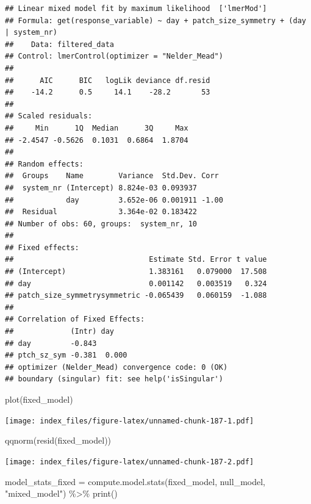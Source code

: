 \documentclass[
]{article}
\newenvironment{Shaded}{\begin{snugshade}}{\end{snugshade}}
\newcommand{\FunctionTok}[1]{\textcolor[rgb]{0.00,0.00,0.00}{#1}}
\newcommand{\NormalTok}[1]{#1}
\newcommand{\OtherTok}[1]{\textcolor[rgb]{0.56,0.35,0.01}{#1}}
\newcommand{\SpecialCharTok}[1]{\textcolor[rgb]{0.00,0.00,0.00}{#1}}
\newcommand{\StringTok}[1]{\textcolor[rgb]{0.31,0.60,0.02}{#1}}
\begin{document}
\begin{verbatim}
## Linear mixed model fit by maximum likelihood  ['lmerMod']
## Formula: get(response_variable) ~ day + patch_size_symmetry + (day | system_nr)
##    Data: filtered_data
## Control: lmerControl(optimizer = "Nelder_Mead")
## 
##      AIC      BIC   logLik deviance df.resid 
##    -14.2      0.5     14.1    -28.2       53 
## 
## Scaled residuals: 
##     Min      1Q  Median      3Q     Max 
## -2.4547 -0.5626  0.1031  0.6864  1.8704 
## 
## Random effects:
##  Groups    Name        Variance  Std.Dev. Corr 
##  system_nr (Intercept) 8.824e-03 0.093937      
##            day         3.652e-06 0.001911 -1.00
##  Residual              3.364e-02 0.183422      
## Number of obs: 60, groups:  system_nr, 10
## 
## Fixed effects:
##                               Estimate Std. Error t value
## (Intercept)                   1.383161   0.079000  17.508
## day                           0.001142   0.003519   0.324
## patch_size_symmetrysymmetric -0.065439   0.060159  -1.088
## 
## Correlation of Fixed Effects:
##             (Intr) day   
## day         -0.843       
## ptch_sz_sym -0.381  0.000
## optimizer (Nelder_Mead) convergence code: 0 (OK)
## boundary (singular) fit: see help('isSingular')
\end{verbatim}

\begin{Shaded}
\begin{Highlighting}[]
\FunctionTok{plot}\NormalTok{(fixed\_model)}
\end{Highlighting}
\end{Shaded}

\texttt{[image: index\_files/figure-latex/unnamed-chunk-187-1.pdf]}

\begin{Shaded}
\begin{Highlighting}[]
\FunctionTok{qqnorm}\NormalTok{(}\FunctionTok{resid}\NormalTok{(fixed\_model))}
\end{Highlighting}
\end{Shaded}

\texttt{[image: index\_files/figure-latex/unnamed-chunk-187-2.pdf]}

\begin{Shaded}
\begin{Highlighting}[]
\NormalTok{model\_stats\_fixed }\OtherTok{=} \FunctionTok{compute.model.stats}\NormalTok{(fixed\_model,}
\NormalTok{                                              null\_model,}
                                              \StringTok{"mixed\_model"}\NormalTok{) }\SpecialCharTok{\%\textgreater{}\%}
  \FunctionTok{print}\NormalTok{()}
\end{Highlighting}
\end{Shaded}
\end{document}
